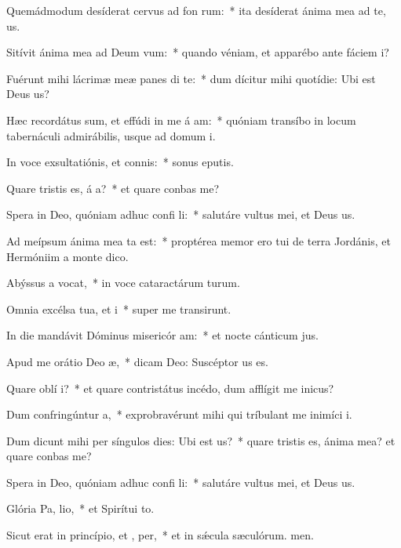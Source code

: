 \item Quemádmodum desíderat cervus ad fon rum:~* ita desíderat ánima mea ad te, us.
\item Sitívit ánima mea ad Deum  vum:~* quando véniam, et apparébo ante fáciem i?
\item Fuérunt mihi lácrimæ meæ panes di  te:~* dum dícitur mihi quotídie: Ubi est Deus us?
\item Hæc recordátus sum, et effúdi in me á am:~* quóniam transíbo in locum tabernáculi admirábilis, usque ad domum i.
\item In voce exsultatiónis, et connis:~* sonus eputis.
\item Quare tristis es, á a?~* et quare conbas me?
\item Spera in Deo, quóniam adhuc confi li:~* salutáre vultus mei, et Deus us.
\item Ad meípsum ánima mea ta est:~* proptérea memor ero tui de terra Jordánis, et Hermóniim a monte dico.
\item Abýssus a vocat,~* in voce cataractárum turum.
\item Omnia excélsa tua, et  i~* super me transirunt.
\item In die mandávit Dóminus misericór am:~* et nocte cánticum jus.
\item Apud me orátio Deo  æ,~* dicam Deo: Suscéptor us es.
\item Quare oblí  i?~* et quare contristátus incédo, dum afflígit me inicus?
\item Dum confringúntur  a,~* exprobravérunt mihi qui tríbulant me inimíci i.
\item Dum dicunt mihi per síngulos dies: Ubi est  us?~* quare tristis es, ánima mea? et quare conbas me?
\item Spera in Deo, quóniam adhuc confi li:~* salutáre vultus mei, et Deus us.
\item Glória Pa,  lio,~* et Spirítui to.
\item Sicut erat in princípio, et ,  per,~* et in sǽcula sæculórum. men.
